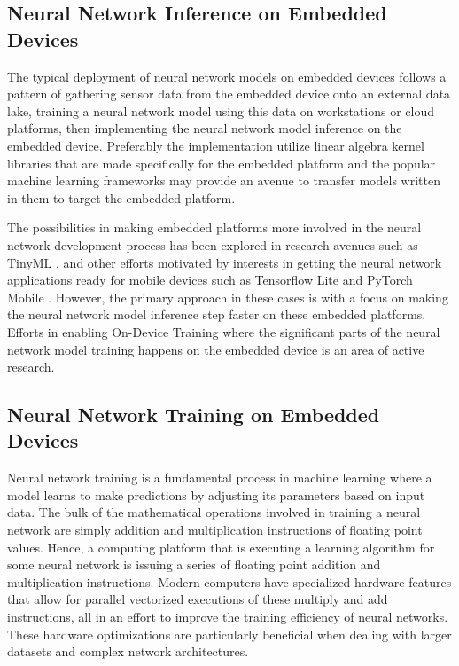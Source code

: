 \subsection{Neural Network Inference on Embedded Devices}

The typical deployment of neural network models on embedded devices follows a pattern of gathering sensor data from the embedded device onto an external data lake, training a neural network model using this data on workstations or cloud platforms, then implementing the neural network model inference on the embedded device. Preferably the implementation utilize linear algebra kernel libraries that are made specifically for the embedded platform and the popular machine learning frameworks may provide an avenue to transfer models written in them to target the embedded platform.

The possibilities in making embedded platforms more involved in the neural network development process has been explored in research avenues such as TinyML \cite{tinyml}, and other efforts motivated by interests in getting the neural network applications ready for mobile devices such as Tensorflow Lite \cite{tfl} and PyTorch Mobile \cite{pytorch-mobile}. However, the primary approach in these cases is with a focus on making the neural network model inference step faster on these embedded platforms. Efforts in enabling On-Device Training where the significant parts of the neural network model training happens on the embedded device is an area of active research.


\subsection{Neural Network Training on Embedded Devices}

Neural network training is a fundamental process in machine learning where a model learns to make predictions by adjusting its parameters based on input data. The bulk of the mathematical operations involved in training a neural network are simply addition and multiplication instructions of floating point values. Hence, a computing platform that is executing a learning algorithm for some neural network is issuing a series of floating point addition and multiplication instructions. Modern computers have specialized hardware features that allow for parallel vectorized executions of these multiply and add instructions, all in an effort to improve the training efficiency of neural networks. These hardware optimizations are particularly beneficial when dealing with larger datasets and complex network architectures.

